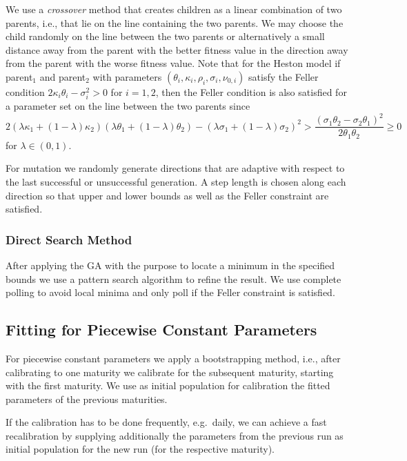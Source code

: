 \documentclass[10pt,a4paper]{article}
\numberwithin{equation}{section} %
\theoremstyle{plain}
\theoremstyle{definition}
\theoremstyle{remark}
\begin{document}
\smallskip

We use a \emph{crossover} method that creates children as a linear combination of two parents, i.e., that lie on the line containing the two parents. We may choose the child randomly on the line between the two parents or alternatively
 a small distance away from the parent with the better fitness value in the direction away from the parent with the worse fitness value. Note that for the Heston model if parent$_1$ and parent$_2$ with parameters $(\theta_i,\kappa_i,\rho_i,\sigma_i,\nu_{0,i})$  satisfy the Feller condition $2\kappa_i\theta_i-\sigma_i^2>0$ for $i=1,2$, then the Feller condition is also satisfied for a parameter set on the line between the two parents since 
\begin{equation*}
2(\lambda\kappa_1+(1-\lambda)\kappa_2)(\lambda\theta_1+(1-\lambda)\theta_2)-(\lambda\sigma_1+(1-\lambda)\sigma_2)^2> \frac{(\sigma_1\theta_2-\sigma_2\theta_1)^2}{2\theta_1\theta_2}\geq0 
\end{equation*} 
for $\lambda\in(0,1)$. 

\smallskip

For mutation we randomly generate directions that are adaptive with respect to the last successful or unsuccessful generation. A step length is chosen along each direction so that upper and lower bounds as well as the Feller constraint are satisfied. 

\medskip

\subsubsection{Direct Search Method}

After applying the GA with the purpose to locate a minimum in the specified bounds we use a pattern search algorithm to refine the result. We use complete polling to avoid local minima and only poll if the Feller constraint is satisfied.

\subsection{Fitting for Piecewise Constant Parameters}

For piecewise constant parameters we apply a bootstrapping method, i.e., after calibrating to one maturity we calibrate for the subsequent maturity, starting with the first maturity. We use as initial population for calibration the fitted parameters of the previous maturities. 

If the calibration has to be done frequently, e.g.\ daily, we can achieve a fast recalibration by supplying additionally the parameters from the previous run as initial population for the new run (for the respective maturity). 
\end{document}
